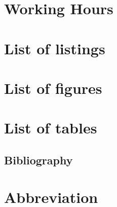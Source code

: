 \singlespacing    %

\section{Working Hours}
    
\pagebreak

\section{List of listings}
{\def\section*#1{}}
\pagebreak

\section{List of figures}
{\def\section*#1{}\listoffigures}
\pagebreak

\section{List of tables}
    {\def\section*#1{}\listoftables}
\pagebreak

\begin{flushleft}
        \section{Bibliography}
    \renewcommand{\headrulewidth}{0.4pt}
    {\def\section*#1{}\printbibliography}
\end{flushleft}
\newpage

\section{Abbreviation}
